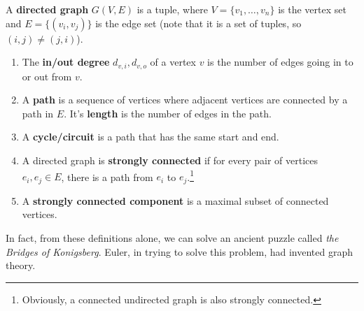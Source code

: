   \begin{definition}
    \label{def:directed-graph}
    A \textbf{directed graph} $G(V, E)$ is a tuple, where $V = \{v_1, \ldots, v_n\}$ is the vertex set and $E = \{(v_i, v_j)\}$ is the edge set (note that it is a set of tuples, so $(i, j) \neq ( j, i)$).
    \begin{enumerate}
      \item The \textbf{in/out degree} $d_{v, i}, d_{v, o}$ of a vertex $v$ is the number of edges going in to or out from $v$. 
      \item A \textbf{path} is a sequence of vertices where adjacent vertices are connected by a path in $E$. It's \textbf{length} is the number of edges in the path. 
      \item A \textbf{cycle/circuit} is a path that has the same start and end. 
      \item A directed graph is \textbf{strongly connected} if for every pair of vertices $e_i, e_j \in E$, there is a path from $e_i$ to $e_j$.\footnote{Obviously, a connected undirected graph is also strongly connected.}
      \item A \textbf{strongly connected component} is a maximal subset of connected vertices. 
    \end{enumerate}
  \end{definition}

  In fact, from these definitions alone, we can solve an ancient puzzle called \textit{the Bridges of Konigsberg}. Euler, in trying to solve this problem, had invented graph theory. 

